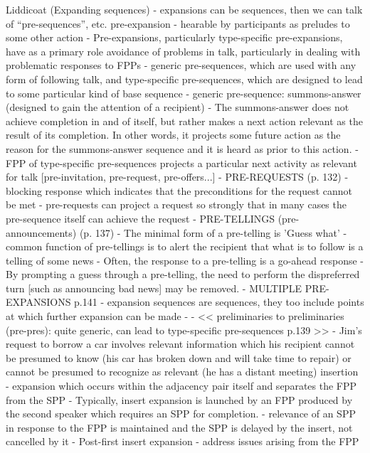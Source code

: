 \documentclass[11pt]{article}
\begin{document}
Liddicoat (Expanding sequences)
- expansions can be sequences, then we can talk of ``pre-sequences'', etc.
pre-expansion
- hearable by participants as preludes to some other action
- Pre-expansions, particularly type-specific pre-expansions, have as a primary role avoidance of problems in talk, particularly in dealing with problematic responses to FPPs
- generic pre-sequences, which are used with any form of following talk, and type-specific pre-sequences, which are designed to lead to some particular kind of base sequence
  - generic pre-sequence: summons-answer (designed to gain the attention of a recipient)
    - The summons-answer does not achieve completion in and of itself, but rather makes a next action relevant as the result of its completion. In other words, it projects some future action as the reason for the summons-answer sequence and it is heard as prior to this action.
  - FPP of type-specific pre-sequences projects a particular next activity as relevant for talk [pre-invitation, pre-request, pre-offers...]
  - PRE-REQUESTS (p. 132)
    - blocking response which indicates that the preconditions for the request cannot be met
    - pre-requests can project a request so strongly that in many cases the pre-sequence itself can achieve the request
  - PRE-TELLINGS (pre-announcements) (p. 137)
    - The minimal form of a pre-telling is 'Guess what'
    - common function of pre-tellings is to alert the recipient that what is to follow is a telling of some news
    - Often, the response to a pre-telling is a go-ahead response
    - By prompting a guess through a pre-telling, the need to perform the dispreferred turn [such as announcing bad news] may be removed.
  - MULTIPLE PRE-EXPANSIONS p.141
    - expansion sequences are sequences, they too include points at which further expansion can be made
    - 
- << preliminaries to preliminaries (pre-pres): quite generic, can lead to type-specific pre-sequences p.139 >>
  - Jim's request to borrow a car involves relevant information which his recipient cannot be presumed to know (his car has broken down and will take time to repair) or cannot be presumed to recognize as relevant (he has a distant meeting)
insertion
- expansion which occurs within the adjacency pair itself and separates the FPP from the SPP
- Typically, insert expansion is launched by an FPP produced by the second speaker which requires an SPP for completion.
- relevance of an SPP in response to the FPP is maintained and the SPP is delayed by the insert, not cancelled by it
- Post-first insert expansion
  - address issues arising from the FPP
\end{document}
